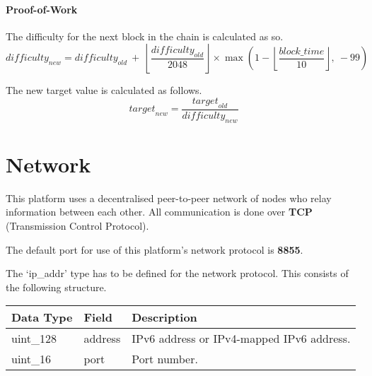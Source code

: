 \documentclass{article}
\begin{document}
\paragraph{Proof-of-Work}
The difficulty for the next block in the chain is calculated as so.
\[\textit{difficulty}_{\textit{new}} = \textit{difficulty}_{\textit{old}}
\ + \ \left\lfloor\dfrac{\textit{difficulty}_{\textit{old}}}{2048}\right\rfloor \times \max\left(1- \left\lfloor \frac{\textit{block\_time}}{10} \right\rfloor,\ -99\right)\]

The new target value is calculated as follows.
\[\textit{target}_{\textit{new}} = \frac{\textit{target}_{\textit{old}}} {\textit{difficulty}_{\textit{new}}}\]

\newpage

\section{Network}
This platform uses a decentralised peer-to-peer network of nodes who relay information between each other. All communication is done over \textbf{TCP} (Transmission Control Protocol).

The default port for use of this platform's network protocol is \textbf{8855}.

The `ip\_addr' type has to be defined for the network protocol. This consists of the following structure.
\begin{table}[H]
\centering
\begin{tabular}{|p{2.2cm}|p{3cm}|p{5.5cm}|}
\hline
\rowcolor{tblgrey}
Data Type   & Field       & Description\\ \hline
uint\_128   & address     & IPv6 address or IPv4-mapped IPv6 address.                    \\ \hline
uint\_16    & port        & Port number.                                                 \\ \hline
\end{tabular}
\end{table}
\end{document}
